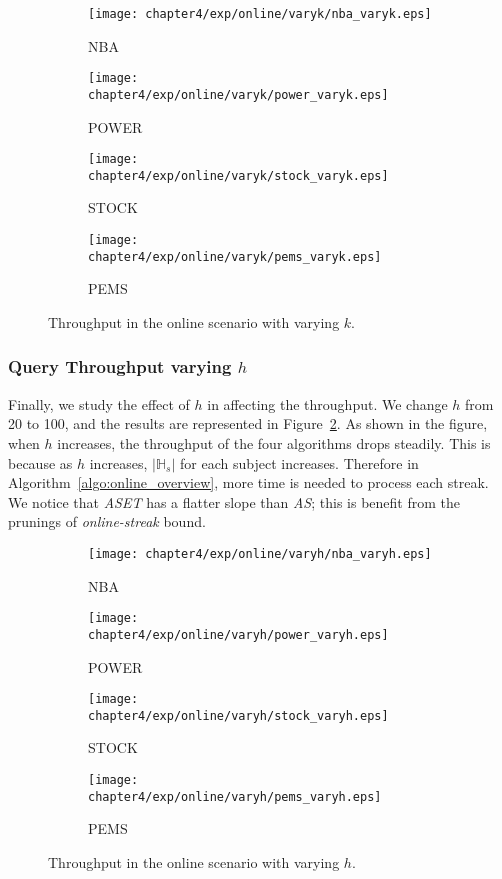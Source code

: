 \begin{figure}[t]
\centering
    \begin{subfigure}[b]{0.45\textwidth}
        \texttt{[image: chapter4/exp/online/varyk/nba\_varyk.eps]}
        \caption{NBA}
    \end{subfigure}
    \begin{subfigure}[b]{0.45\textwidth}
        \texttt{[image: chapter4/exp/online/varyk/power\_varyk.eps]}
        \caption{POWER}
    \end{subfigure}
    \begin{subfigure}[b]{0.45\textwidth}
        \texttt{[image: chapter4/exp/online/varyk/stock\_varyk.eps]}
        \caption{STOCK}
    \end{subfigure}
    \begin{subfigure}[b]{0.45\textwidth}
        \texttt{[image: chapter4/exp/online/varyk/pems\_varyk.eps]}
        \caption{PEMS}
    \end{subfigure}
\caption{Throughput in the online scenario with varying $k$.}
\label{exp:online_mining_vary_k}
\end{figure}

\subsubsection{Query Throughput varying $h$}
Finally, we study the effect of $h$ in affecting the throughput.
We change $h$ from 20 to 100, and the results are represented in Figure~\ref{exp:online_mining_vary_h}.
As shown in the figure, when $h$ increases, 
the throughput of the four algorithms drops steadily.
This is because as $h$ increases, $|\mathbb{H}_s|$ for each subject
increases. Therefore in Algorithm~\ref{algo:online_overview}, more time is needed 
to process each streak. We notice that \emph{ASET} has a flatter slope than \emph{AS}; this
is benefit from the prunings of \emph{online-streak} bound.
\begin{figure}[h]
\centering
    \begin{subfigure}[b]{0.45\textwidth}
        \texttt{[image: chapter4/exp/online/varyh/nba\_varyh.eps]}
        \caption{NBA}
    \end{subfigure}
    \begin{subfigure}[b]{0.45\textwidth}
        \texttt{[image: chapter4/exp/online/varyh/power\_varyh.eps]}
        \caption{POWER}
    \end{subfigure}
    \begin{subfigure}[b]{0.45\textwidth}
        \texttt{[image: chapter4/exp/online/varyh/stock\_varyh.eps]}
        \caption{STOCK}
    \end{subfigure}
    \begin{subfigure}[b]{0.45\textwidth}
        \texttt{[image: chapter4/exp/online/varyh/pems\_varyh.eps]}
        \caption{PEMS}
    \end{subfigure}
\caption{Throughput in the online scenario with varying $h$.}
\label{exp:online_mining_vary_h}
\end{figure}

